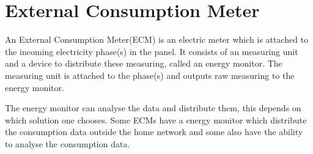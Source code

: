\section{External Consumption Meter}\label{ecm}
An External Consumption Meter(ECM) is an electric meter which is attached to the incoming electricity phase(s) in the panel.
It consists of an measuring unit and a device to distribute these measuring, called an energy monitor.
The measuring unit is attached to the phase(s) and outputs raw measuring to the energy monitor.

The energy monitor can analyse the data and distribute them, this depends on which solution one chooses.
Some ECMs have a energy monitor which distribute the consumption data outside the home network and some also have the ability to analyse the consumption data.\cite{TED}\cite{efergy}\cite{open_energy_monitor}
